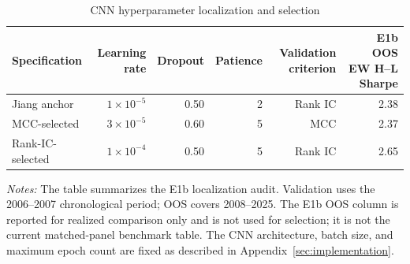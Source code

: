 \begin{table}[htbp]
\centering
\caption{CNN hyperparameter localization and selection}
\label{tab:cnn_hp_localization}
\begin{tabular}{lrrrrr}
\toprule
Specification & Learning rate & Dropout & Patience & Validation criterion & E1b OOS EW H--L Sharpe \\
\midrule
Jiang anchor & $1\times10^{-5}$ & 0.50 & 2 & Rank IC & 2.38 \\
MCC-selected & $3\times10^{-5}$ & 0.60 & 5 & MCC & 2.37 \\
Rank-IC-selected & $1\times10^{-4}$ & 0.50 & 5 & Rank IC & 2.65 \\
\bottomrule
\end{tabular}
\begin{minipage}{0.94\linewidth}
\footnotesize
\textit{Notes:} The table summarizes the E1b localization audit. Validation uses the 2006--2007 chronological period; OOS covers 2008--2025. The E1b OOS column is reported for realized comparison only and is not used for selection; it is not the current matched-panel benchmark table. The CNN architecture, batch size, and maximum epoch count are fixed as described in Appendix~\ref{sec:implementation}.
\end{minipage}
\end{table}
